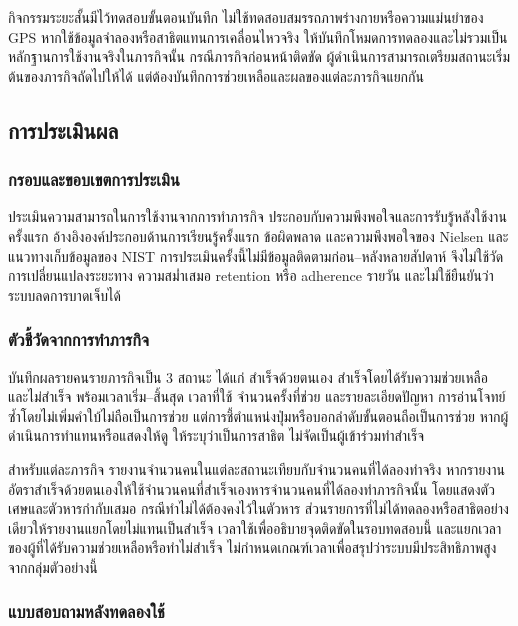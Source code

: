 กิจกรรมระยะสั้นมีไว้ทดสอบขั้นตอนบันทึก ไม่ใช้ทดสอบสมรรถภาพร่างกายหรือความแม่นยำของ GPS หากใช้ข้อมูลจำลองหรือสาธิตแทนการเคลื่อนไหวจริง ให้บันทึกโหมดการทดลองและไม่รวมเป็นหลักฐานการใช้งานจริงในภารกิจนั้น กรณีภารกิจก่อนหน้าติดขัด ผู้ดำเนินการสามารถเตรียมสถานะเริ่มต้นของภารกิจถัดไปให้ได้ แต่ต้องบันทึกการช่วยเหลือและผลของแต่ละภารกิจแยกกัน

\subsection{การประเมินผล}
\label{sec:single-session-evalSFTion}

\subsubsection{กรอบและขอบเขตการประเมิน}

ประเมินความสามารถในการใช้งานจากการทำภารกิจ ประกอบกับความพึงพอใจและการรับรู้หลังใช้งานครั้งแรก อ้างอิงองค์ประกอบด้านการเรียนรู้ครั้งแรก ข้อผิดพลาด และความพึงพอใจของ Nielsen \cite{nielsen2012usability} และแนวทางเก็บข้อมูลของ NIST \cite{nistUsabilityTesting} การประเมินครั้งนี้ไม่มีข้อมูลติดตามก่อน--หลังหลายสัปดาห์ จึงไม่ใช้วัดการเปลี่ยนแปลงระยะทาง ความสม่ำเสมอ retention หรือ adherence รายวัน และไม่ใช้ยืนยันว่าระบบลดการบาดเจ็บได้

\subsubsection{ตัวชี้วัดจากการทำภารกิจ}

บันทึกผลรายคนรายภารกิจเป็น 3 สถานะ ได้แก่ สำเร็จด้วยตนเอง สำเร็จโดยได้รับความช่วยเหลือ และไม่สำเร็จ พร้อมเวลาเริ่ม--สิ้นสุด เวลาที่ใช้ จำนวนครั้งที่ช่วย และรายละเอียดปัญหา การอ่านโจทย์ซ้ำโดยไม่เพิ่มคำใบ้ไม่ถือเป็นการช่วย แต่การชี้ตำแหน่งปุ่มหรือบอกลำดับขั้นตอนถือเป็นการช่วย หากผู้ดำเนินการทำแทนหรือแสดงให้ดู ให้ระบุว่าเป็นการสาธิต ไม่จัดเป็นผู้เข้าร่วมทำสำเร็จ

สำหรับแต่ละภารกิจ รายงานจำนวนคนในแต่ละสถานะเทียบกับจำนวนคนที่ได้ลองทำจริง หากรายงานอัตราสำเร็จด้วยตนเองให้ใช้จำนวนคนที่สำเร็จเองหารจำนวนคนที่ได้ลองทำภารกิจนั้น โดยแสดงตัวเศษและตัวหารกำกับเสมอ กรณีทำไม่ได้ต้องคงไว้ในตัวหาร ส่วนรายการที่ไม่ได้ทดลองหรือสาธิตอย่างเดียวให้รายงานแยกโดยไม่แทนเป็นสำเร็จ เวลาใช้เพื่ออธิบายจุดติดขัดในรอบทดสอบนี้ และแยกเวลาของผู้ที่ได้รับความช่วยเหลือหรือทำไม่สำเร็จ ไม่กำหนดเกณฑ์เวลาเพื่อสรุปว่าระบบมีประสิทธิภาพสูงจากกลุ่มตัวอย่างนี้

\subsubsection{แบบสอบถามหลังทดลองใช้}


